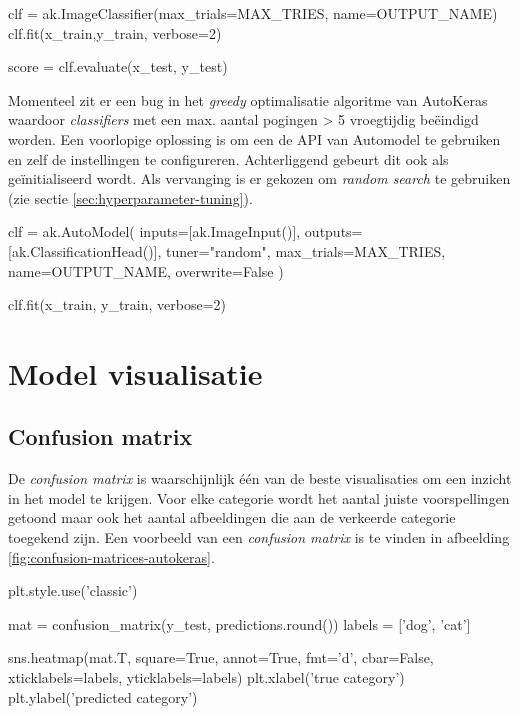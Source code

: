 \bigskip

\begin{python}
clf = ak.ImageClassifier(max_trials=MAX_TRIES, name=OUTPUT_NAME)
clf.fit(x_train,y_train, verbose=2)

score = clf.evaluate(x_test, y_test)
\end{python}

Momenteel zit er een bug in het \textit{greedy} optimalisatie algoritme van AutoKeras waardoor \textit{classifiers} met een max. aantal pogingen > 5 vroegtijdig beëindigd worden. Een voorlopige oplossing is om een de API van Automodel te gebruiken en zelf de instellingen te configureren. Achterliggend gebeurt dit ook als  geïnitialiseerd wordt. Als vervanging is er gekozen om \textit{random search} te gebruiken (zie sectie \ref{sec:hyperparameter-tuning}).

\bigskip

\begin{python}
clf = ak.AutoModel(
    inputs=[ak.ImageInput()], 
    outputs=[ak.ClassificationHead()], 
    tuner="random",
    max_trials=MAX_TRIES, 
    name=OUTPUT_NAME,
    overwrite=False
    )
    
clf.fit(x_train, y_train, verbose=2)
\end{python}

\section{Model visualisatie}
\label{sec:vis-autokeras}

\subsection{Confusion matrix}
\label{subsec:confusion-autokeras}

De \textit{confusion matrix} is waarschijnlijk één van de beste visualisaties om een inzicht in het model te krijgen. Voor elke categorie wordt het aantal juiste voorspellingen getoond maar ook het aantal afbeeldingen die aan de verkeerde categorie toegekend zijn. Een voorbeeld van een \textit{confusion matrix} is te vinden in afbeelding \ref{fig:confusion-matrices-autokeras}.

\bigskip

\begin{python}
plt.style.use('classic')

mat = confusion_matrix(y_test, predictions.round())
labels = ['dog', 'cat']

sns.heatmap(mat.T, square=True, annot=True, fmt='d', cbar=False, xticklabels=labels, yticklabels=labels)
plt.xlabel('true category')
plt.ylabel('predicted category')
\end{python} 


